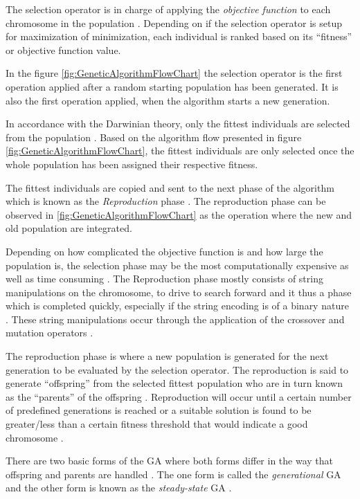 The selection operator is in charge of applying the \emph{objective function} to each chromosome in the population \cite{AdaptiveSAGA,HumanPassiveGA}. Depending on if the selection operator is setup for maximization of minimization, each individual is ranked based on its ``fitness'' or objective function value.

In the figure \ref{fig:GeneticAlgorithmFlowChart} the selection operator is the first operation applied after a random starting population has been generated. It is also the first operation applied, when the algorithm starts a new generation.

In accordance with the Darwinian theory, only the fittest individuals are selected from the population \cite{HumanPassiveGA}. Based on the algorithm flow presented in figure \ref{fig:GeneticAlgorithmFlowChart}, the fittest individuals are only selected once the whole population has been assigned their respective fitness. 

The fittest individuals are copied and sent to the next phase of the algorithm which is known as the \emph{Reproduction} phase \cite{HumanPassiveGA}. The reproduction phase can be observed in \ref{fig:GeneticAlgorithmFlowChart} as the operation where the new and old population are integrated.

Depending on how complicated the objective function is and how large the population is, the selection phase may be the most computationally expensive as well as time consuming \cite{AcceleratingGA}. The Reproduction phase mostly consists of string manipulations on the chromosome, to drive to search forward and it thus a phase which is completed quickly, especially if the string encoding is of a binary nature \cite{AcceleratingGA,AdaptiveSAGA}. These string manipulations occur through the application of the crossover and mutation operators \cite{ConstrainedGA}. 

The reproduction phase is where a new population is generated for the next generation to be evaluated by the selection operator. The reproduction is said to generate ``offspring'' from the selected fittest population who are in turn known as the ``parents'' of the offspring \cite{HumanPassiveGA,ConstrainedGA}. Reproduction will occur until a certain number of predefined generations is reached or a suitable solution is found to be greater/less than a certain fitness threshold that would indicate a good chromosome \cite{GATSP}.

There are two basic forms of the GA where both forms differ in the way that offspring and parents are handled \cite{FamilyGA}. The one form is called the \emph{generational} GA  and the other form is known as the \emph{steady-state} GA \cite{GeostatisticalGA,FamilyGA}.

